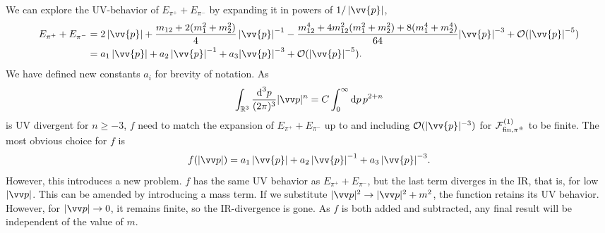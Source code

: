 We can explore the UV-behavior of $E_{\pi^+} + E_{\pi^-}$ by expanding it in powers of $1 / \abs{\vv{p}}$,
%
\begin{align}
    \nonumber
    E_{\pi^+} + E_{\pi^-}
    & = 
    2  \abs{\vv{p}}
    + \frac{m_{12} + 2(m_1^2 + m_2^2)}{4} \, {\abs{\vv{p}}}^{-1}
    - \frac{m_{12}^4 + 4 m_{12}^2(m_1^2 + m_2^2) + 8(m_1^4 + m_2^4)}{64}
    {\abs{\vv{p}}}^{-3}
    + \Oh (\abs{\vv{p}}^{-5})
    \\
    & = 
    a_1  \abs{\vv{p}}
    + a_2 \, {\abs{\vv{p}}}^{-1}
    + a_3
    {\abs{\vv{p}}}^{-3}
    + \Oh (\abs{\vv{p}}^{-5}).
\end{align}
%
We have defined new constants $a_i$ for brevity of notation.
As
%
\begin{equation}
    \int_{\R^3} \frac{\dd^3 p}{(2 \pi)^3} |\vv p|^{n}
    = C \int_{0}^\infty \dd p \, p^{2 + n}
\end{equation}
%
is UV divergent for $n \geq -3$, $f$ need to match the expansion of $E_{\pi^+} + E_{\pi^-}$ up to and including $\Oh(|\vv{p}|^{-3})$ for $\mathcal{F}^{(1)}_{\mathrm{fin}, {\pi^\pm} }$ to be finite.
The most obvious choice for $f$ is
%
\begin{equation}
    f(|\vv p|) 
    = a_1  \abs{\vv{p}} + a_2 \, {\abs{\vv{p}}}^{-1} + a_3 \, {\abs{\vv{p}}}^{-3}.
\end{equation}
%
However, this introduces a new problem.
$f$ has the same UV behavior as $E_{\pi^+} + E_{\pi^-}$, but the last term diverges in the IR, that is, for low $|\vv p|$.
This can be amended by introducing a mass term.
If we substitute $|\vv p|^2 \rightarrow |\vv p|^2 + m^2$, the function retains its UV behavior.
However, for $|\vv p| \rightarrow 0$, it remains finite, so the IR-divergence is gone.
As $f$ is both added and subtracted, any final result will be independent of the value of $m$.

